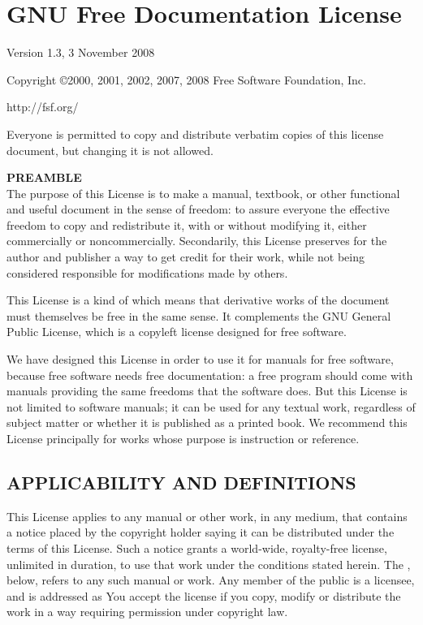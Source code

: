 \chapter{GNU Free Documentation License}
\label{app:gnufreedocumentationlicense}
\begin{centering}
Version 1.3, 3 November 2008

Copyright \copyright 2000, 2001, 2002, 2007, 2008 Free Software Foundation, Inc.

http://fsf.org/

\end{centering}
\vspace{0.1in}
Everyone is permitted to copy and distribute verbatim copies of this
license document, but changing it is not allowed.
\vspace{0.1in}

\textbf{\Large{PREAMBLE}} \\
The purpose of this License is to make a manual, textbook,
or other functional and useful document 
 in the sense of
freedom: to assure everyone the effective freedom to copy
and redistribute it, with or without modifying it, either
commercially or noncommercially. Secondarily, this License
preserves for the author and publisher a way to get credit
for their work, while not being considered responsible for
modifications made by others.

This License is a kind of  which means that
derivative works of the document must themselves be free in
the same sense. It complements the GNU General Public License,
which is a copyleft license designed for free software.

We have designed this License in order to use it for
manuals for free software, because free software needs free
documentation: a free program should come with manuals
providing the same freedoms that the software does. But
this License is not limited to software manuals; it can be
used for any textual work, regardless of subject matter or
whether it is published as a printed book. We recommend this
License principally for works whose purpose is instruction
or reference.  

\section{APPLICABILITY AND DEFINITIONS}
\label{gnu:applicabilityanddefinitions}
This License applies to any manual or other work, in any
medium, that contains a notice placed by the copyright
holder saying it can be distributed under the terms of this
License. Such a notice grants a world-wide, royalty-free
license, unlimited in duration, to use that work under
the conditions stated herein. The , below,
refers to any such manual or work. Any member of the public
is a licensee, and is addressed as  You accept the
license if you copy, modify or distribute the work in a way
requiring permission under copyright law.

